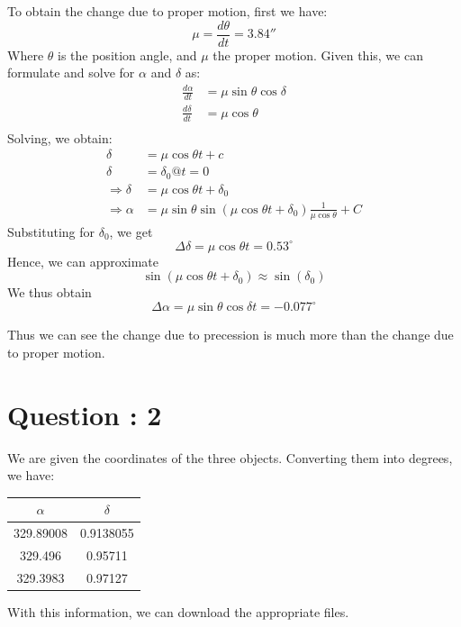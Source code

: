 \documentclass{article}
\begin{document}
To obtain the change due to proper motion, first we have:
\begin{equation}
\mu = \frac{d\theta}{dt}=3.84''
\end{equation}
Where $\theta$ is the position angle, and $\mu$ the proper motion. Given this, we can formulate and solve for $\alpha$ and $\delta$ as:
\begin{equation}
\begin{split}
\frac{d\alpha}{dt} &= \mu\sin\theta\cos\delta \\
\frac{d\delta}{dt} &=\mu\cos\theta \\
\end{split}
\end{equation}
Solving, we obtain:
\begin{equation}
\begin{split}
\delta &= \mu\cos\theta t + c \\
\delta &=\delta_0 @ t=0 \\
\Rightarrow \delta &= \mu\cos\theta t + \delta_0 \\
\Rightarrow \alpha &=\mu\sin\theta\sin(\mu\cos\theta t + \delta_0)\frac{1}{\mu\cos\theta} + C
\end{split}
\end{equation}
Substituting for $\delta_0$, we get $$\Delta\delta = \mu\cos\theta t = 0.53^\circ $$
Hence, we can approximate $$\sin(\mu\cos\theta t + \delta_0) \approx \sin(\delta_0)$$ We thus obtain
$$\Delta\alpha = \mu\sin\theta\cos\delta t = -0.077^\circ$$

Thus we can see the change due to precession is much more than the change due to proper motion.
\section{Question : 2}
We are given the coordinates of the three objects. Converting them into degrees, we have:
\begin{center}
\begin{tabular}{|c|c|}
\hline 
$\alpha$ & $\delta$ \\
\hline 
329.89008 & 0.9138055 \\
329.496 & 0.95711 \\
329.3983 & 0.97127\\
\hline
\end{tabular}
\end{center}
With this information, we can download the appropriate files. 
\end{document}
